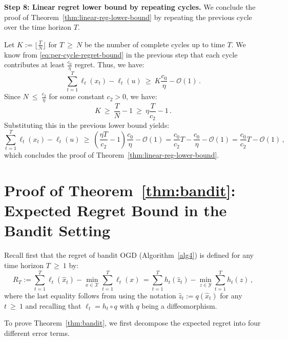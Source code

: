 \documentclass[a4paper,11pt,fullpage]{article}
\def\X{{\mathcal X}}
\def\Y{{\mathcal Y}}
\theoremstyle{plain}
\theoremstyle{definition}
\theoremstyle{plain}
\renewcommand{\leq}{~\le~}
\renewcommand{\geq}{~\ge~}
\begin{document}
\noindent\textbf{Step 8: Linear regret lower bound by repeating cycles.} We conclude the proof of Theorem~\ref{thm:linear-reg-lower-bound} by repeating the previous cycle over the time horizon $T$. 

Let $K := \lfloor \frac{T}{N} \rfloor$ for $T \geq N$  be the number of complete cycles up to time $T$. We know from \eqref{eq:per-cycle-regret-bound} in the previous step that each cycle contributes at least $\frac{c_0}{\eta}$ regret. Thus, we have: 
\begin{equation*}
\sum_{t=1}^T \ell_t(x_t) - \ell_t(u) \geq K \frac{c_0}{\eta} - \mathcal{O}(1)\,.
\end{equation*}
Since $N \leq \frac{c_2}{\eta}$ for some constant $c_2 > 0$, we have: 
\begin{equation*}
K \geq \frac{T}{N} -1 \geq \eta \frac{T}{c_2} - 1\,.
\end{equation*}
Substituting this in the previous lower bound yields: 
\begin{equation*}
    \sum_{t=1}^T \ell_t(x_t) - \ell_t(u) \geq \left( \frac{\eta T}{c_2} - 1 \right) \frac{c_0}{\eta} - \mathcal{O}(1) = \frac{c_0}{c_2} T - \frac{c_0}{\eta} - \mathcal{O}(1) = \frac{c_0}{c_2} T - \mathcal{O}(1)\,, 
\end{equation*}
which concludes the proof of Theorem~\ref{thm:linear-reg-lower-bound}. 

\section{Proof of Theorem~\ref{thm:bandit}: Expected Regret Bound in the Bandit Setting}
\label{appx:proofs-bandit}

Recall first that the regret of bandit OGD (Algorithm~\ref{alg4}) is defined for any time horizon $T \geq 1$ by: 
\begin{equation}
\label{eq:regret-bogd}
R_T := \sum_{t=1}^T \ell_t(\hat{x}_t) - \min_{x \in \X} \sum_{t=1}^T \ell_t(x)\, 
= \sum_{t=1}^T h_t(\hat{z}_t) - \min_{z \in \Y} \sum_{t=1}^T h_t(z)\,,
\end{equation}
where the last equality follows from using the notation $\hat{z}_t := q(\hat{x}_t)$ for any $t \geq 1$ and recalling that $\ell_t = h_t \circ q$ with $q$ being a diffeomorphism. 

To prove Theorem~\ref{thm:bandit}, we first decompose the expected regret into four different error terms.
\end{document}
